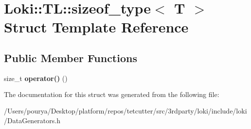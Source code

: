 \hypertarget{structLoki_1_1TL_1_1sizeof__type}{}\section{Loki\+:\+:T\+L\+:\+:sizeof\+\_\+type$<$ T $>$ Struct Template Reference}
\label{structLoki_1_1TL_1_1sizeof__type}
\subsection*{Public Member Functions}
\begin{DoxyCompactItemize}
\item 
\hypertarget{structLoki_1_1TL_1_1sizeof__type_a33fa2b7250fd49c5927d2650fc8ac5a5}{}size\+\_\+t {\bfseries operator()} ()\label{structLoki_1_1TL_1_1sizeof__type_a33fa2b7250fd49c5927d2650fc8ac5a5}

\end{DoxyCompactItemize}


The documentation for this struct was generated from the following file\+:\begin{DoxyCompactItemize}
\item 
/\+Users/pourya/\+Desktop/platform/repos/tetcutter/src/3rdparty/loki/include/loki/Data\+Generators.\+h\end{DoxyCompactItemize}
